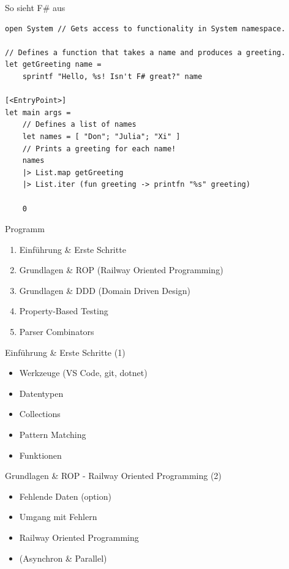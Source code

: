 \documentclass[t]{beamer}
\begin{document}
\begin{frame}[label={sec:org5c560e8},fragile]{So sieht F\# aus}
 \begin{verbatim}
open System // Gets access to functionality in System namespace.

// Defines a function that takes a name and produces a greeting.
let getGreeting name =
    sprintf "Hello, %s! Isn't F# great?" name

[<EntryPoint>]
let main args =
    // Defines a list of names
    let names = [ "Don"; "Julia"; "Xi" ]
    // Prints a greeting for each name!
    names
    |> List.map getGreeting
    |> List.iter (fun greeting -> printfn "%s" greeting)

    0
\end{verbatim}
\end{frame}

\begin{frame}[label={sec:org803fb7f}]{Programm}
\begin{enumerate}
\item Einführung \& Erste Schritte
\item Grundlagen \& ROP (Railway Oriented Programming)
\item Grundlagen \& DDD (Domain Driven Design)
\item Property-Based Testing
\item Parser Combinators
\end{enumerate}
\end{frame}

\begin{frame}[label={sec:org988b62a}]{Einführung \& Erste Schritte (1)}
\begin{itemize}
\item Werkzeuge (VS Code, git, dotnet)
\item Datentypen
\item Collections
\item Pattern Matching
\item Funktionen
\end{itemize}
\end{frame}

\begin{frame}[label={sec:org403fac5}]{Grundlagen \& ROP - Railway Oriented Programming (2)}
\begin{itemize}
\item Fehlende Daten (option)
\item Umgang mit Fehlern
\item Railway Oriented Programming
\item (Asynchron \& Parallel)
\end{itemize}
\end{frame}
\end{document}
